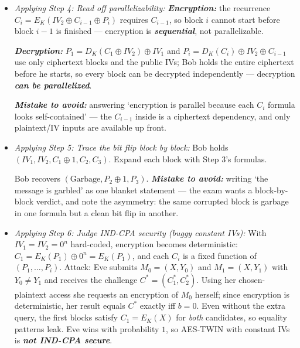 \documentclass[12pt, a4paper]{article}
\newcommand{\term}[1]{\textbf{\textit{#1}}}        %
\begin{document}
\begin{itemize}
    \term{Why:} the check costs one line and catches sign errors the grader will catch otherwise.
    \item \textit{Applying Step 4: Read off parallelizability:} \term{Encryption:} the recurrence $C_i = E_K(IV_2 \oplus C_{i-1} \oplus P_i)$ requires $C_{i-1}$, so block $i$ cannot start before block $i - 1$ is finished --- encryption is \term{sequential}, not parallelizable.

    \term{Decryption:} $P_1 = D_K(C_1 \oplus IV_2) \oplus IV_1$ and $P_i = D_K(C_i) \oplus IV_2 \oplus C_{i-1}$ use only ciphertext blocks and the public IVs; Bob holds the entire ciphertext before he starts, so every block can be decrypted independently --- decryption \term{can be parallelized}.

    \term{Mistake to avoid:} answering `encryption is parallel because each $C_i$ formula looks self-contained' --- the $C_{i-1}$ inside is a ciphertext dependency, and only plaintext/IV inputs are available up front.
    \item \textit{Applying Step 5: Trace the bit flip block by block:} Bob holds $(IV_1, IV_2, C_1 \oplus 1, C_2, C_3)$. Expand each block with Step 3's formulas.
    Bob recovers $(\text{Garbage}, P_2 \oplus 1, P_3)$. \term{Mistake to avoid:} writing `the message is garbled' as one blanket statement --- the exam wants a block-by-block verdict, and note the asymmetry: the same corrupted block is garbage in one formula but a clean bit flip in another.
    \item \textit{Applying Step 6: Judge IND-CPA security (buggy constant IVs):} With $IV_1 = IV_2 = 0^n$ hard-coded, encryption becomes deterministic: $C_1 = E_K(P_1) \oplus 0^n = E_K(P_1)$, and each $C_i$ is a fixed function of $(P_1, \dots, P_i)$.
    Attack: Eve submits $M_0 = (X, Y_0)$ and $M_1 = (X, Y_1)$ with $Y_0 \neq Y_1$ and receives the challenge $C^* = (C_1^*, C_2^*)$.
    Using her chosen-plaintext access she requests an encryption of $M_0$ herself; since encryption is deterministic, her result equals $C^*$ exactly iff $b = 0$.
    Even without the extra query, the first blocks satisfy $C_1 = E_K(X)$ for \emph{both} candidates, so equality patterns leak. Eve wins with probability $1$, so AES-TWIN with constant IVs is \term{not IND-CPA secure}.


\end{itemize}
\end{document}
